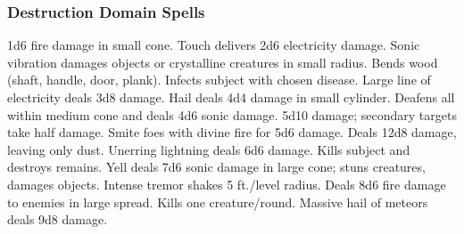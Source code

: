 \subsubsection{Destruction Domain Spells}
\begin{spelllist}
   1d6 fire damage in small cone.
   Touch delivers 2d6 electricity damage.
   Sonic vibration damages objects or crystalline creatures in small radius.
   Bends wood (shaft, handle, door, plank).
   Infects subject with chosen disease.
   Large line of electricity deals 3d8 damage.
   Hail deals 4d4 damage in small cylinder.
   Deafens all within medium cone and deals 4d6 sonic damage.
   5d10 damage; secondary targets take half damage.
   Smite foes with divine fire for 5d6 damage.
   Deals 12d8 damage, leaving only dust.
   Unerring lightning deals 6d6 damage.
  \F Kills subject and destroys remains.
   Yell deals 7d6 sonic damage in large cone; stuns creatures, damages objects.
   Intense tremor shakes 5 ft./level radius.
   Deals 8d6 fire damage to enemies in large spread.
   Kills one creature/round.
   Massive hail of meteors deals 9d8 damage.
\end{spelllist}

